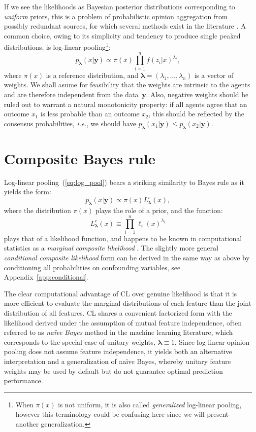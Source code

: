\documentclass[english]{scrartcl}
\def\y{{\mathbf{y}}}
\newcommand{\blambda}{{\boldsymbol{\lambda}}}
\begin{document}
If we see the likelihoods as Bayesian posterior distributions corresponding to {\em uniform} priors, this is a problem of probabilistic opinion aggregation from possibly redundant sources, for which several methods exist in the literature \cite{Tarantola-82,Genest-86,Garg-04,Allard-12}. A common choice, owing to its simplicity and tendency to produce single peaked distributions, is log-linear pooling\footnote{When $\pi(x)$ is not uniform, it is also called {\em generalized} log-linear pooling, however this terminology could be confusing here since we will present another generalization.}:
\begin{equation}
\label{eq:log_pool}
p_\blambda(x|\y) \propto \pi(x) \prod_{i=1}^n f(z_i|x)^{\lambda_i},
\end{equation} 
where $\pi(x)$ is a reference distribution, and $\blambda=(\lambda_1,\ldots,\lambda_n)$ is a vector of weights. We shall asume for feasibility that the weights are intrinsic to the agents and are therefore independent from the data~$\y$. Also, negative weights should be ruled out to warrant a natural monotonicity property: if all agents agree that an outcome $x_1$ is less probable than an outcome $x_2$, this should be reflected by the consensus probabilities, {\em i.e.}, we should have $p_\blambda(x_1|\y)\leq p_\blambda(x_2|\y)$. 


\section{Composite Bayes rule}
\label{sec:bayes_rule}

Log-linear pooling~(\ref{eq:log_pool}) bears a striking similarity to Bayes rule as it yields the form: 
$$
p_\blambda(x|\y)\propto \pi(x) L^c_\blambda(x),
$$
where the distribution $\pi(x)$ plays the role of a prior, and the function:
\begin{equation}
\label{eq:comp_lik}
L^c_\blambda(x) \equiv \prod_{i=1}^n \ell_i (x)^{\lambda_i}
\end{equation} 
plays that of a likelihood function, and happens to be known in computational statistics as a {\em marginal composite likelihood} \cite{Varin-11}. The slightly more general {\em conditional composite likelihood} form can be derived in the same way as above by conditioning all probabilities on confounding variables, see Appendix~\ref{app:conditional}. 

The clear computational advantage of CL over genuine likelihood is that it is more efficient to evaluate the marginal distributions of each feature than the joint distribution of all features. CL shares a convenient factorized form with the likelihood derived under the assumption of mutual feature independence, often referred to as {\em na\"ive Bayes} method in the machine learning literature, which corresponds to the special case of unitary weights, $\blambda\equiv 1$. Since log-linear opinion pooling does not assume feature independence, it yields both an alternative interpretation and a generalization of na\"ive Bayes, whereby unitary feature weights may be used by default but do not guarantee optimal prediction performance.
\end{document}
